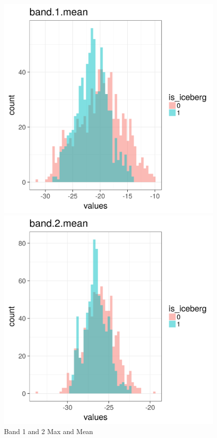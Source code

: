 \documentclass[fleqn,10pt]{SelfArx} %
\begin{document}
\begin{figure}[ht]
\begin{minipage}{0.24\textwidth}
	\end{minipage}
	\begin{minipage}{0.24\textwidth}
		\includegraphics[scale=0.2]{iceberg/analysis/band_1_mean.png}
	\end{minipage}%
	\begin{minipage}{0.24\textwidth}
		\includegraphics[scale=0.2]{iceberg/analysis/band_2_mean.png}
	\end{minipage}
	\caption{Band 1 and 2 Max and Mean}\label{max-mean-separable}
\end{figure}
\end{document}
